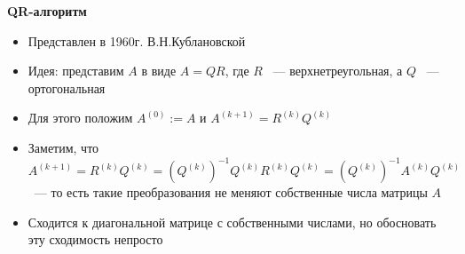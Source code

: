 \textbf{QR-алгоритм}
    \begin{itemize}
        \item Представлен в 1960г. В.Н.Кублановской
        \item Идея: представим \(A\) в виде \(A = QR\), где \(R\) ~--- верхнетреугольная, а \(Q\) ~--- ортогональная
        \item Для этого положим \(A^{(0)} := A\) и \(A^{(k+1)} = R^{(k)}Q^{(k)}\)
        \item Заметим, что \(A^{(k+1)} = R^{(k)}Q^{(k)} = (Q^{(k)})^{-1}Q^{(k)}R^{(k)}Q^{(k)} = (Q^{(k)})^{-1}A^{(k)}Q^{(k)}\) ~--- то есть такие преобразования не меняют собственные числа матрицы \(A\)
        \item Сходится к диагональной матрице с собственными числами, но обосновать эту сходимость непросто
    \end{itemize}
    
